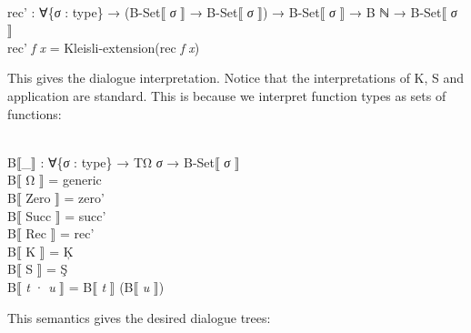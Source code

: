 \documentclass{entcs} \usepackage{prentcsmacro}
\newcommand{\AgdaFontStyle}[1]{\textsf{#1}}
\newcommand{\AgdaBoundFontStyle}[1]{\textit{#1}}
\newcommand{\AgdaSymbol}      [1]{\textcolor{AgdaSymbol}{#1}}
\newcommand{\AgdaBound}    [1]{\AgdaBoundFontStyle{\textcolor{AgdaBound}{#1}}}
\newcommand{\AgdaInductiveConstructor}[1]
    {\AgdaFontStyle{\textcolor{AgdaInductiveConstructor}{#1}}}
\newcommand{\AgdaDatatype} [1]{\AgdaFontStyle{\textcolor{AgdaDatatype}{#1}}}
\newcommand{\AgdaFunction} [1]{\AgdaFontStyle{\textcolor{AgdaFunction}{#1}}}
\newcommand{\AgdaCodeStyle}{\small}
\newenvironment{code}%
{\noindent\AgdaCodeStyle\pboxed}%
{\endpboxed\par\noindent%
\ignorespacesafterend}
\begin{document}
\begin{code}\>\<%
\\
\>\AgdaFunction{rec'} \AgdaSymbol{:} \AgdaSymbol{∀\{}\AgdaBound{σ} \AgdaSymbol{:} \AgdaDatatype{type}\AgdaSymbol{\}} \AgdaSymbol{→} \AgdaSymbol{(}\AgdaFunction{B-Set⟦} \AgdaBound{σ} \AgdaFunction{⟧} \AgdaSymbol{→} \AgdaFunction{B-Set⟦} \AgdaBound{σ} \AgdaFunction{⟧}\AgdaSymbol{)} \AgdaSymbol{→} \AgdaFunction{B-Set⟦} \AgdaBound{σ} \AgdaFunction{⟧} \AgdaSymbol{→} \AgdaFunction{B} \AgdaDatatype{ℕ} \AgdaSymbol{→} \AgdaFunction{B-Set⟦} \AgdaBound{σ} \AgdaFunction{⟧}\<%
\\
\>\AgdaFunction{rec'} \AgdaBound{f} \AgdaBound{x} \AgdaSymbol{=} \AgdaFunction{Kleisli-extension}\AgdaSymbol{(}\AgdaFunction{rec} \AgdaBound{f} \AgdaBound{x}\AgdaSymbol{)}\<%
\\
\>\<\end{code}
This gives the  dialogue interpretation. Notice that the interpretations
of K, S and application are standard. This is because we interpret
function types as sets of functions:

\begin{code}\>\<%
\\
\>\AgdaFunction{B⟦\_⟧} \AgdaSymbol{:} \AgdaSymbol{∀\{}\AgdaBound{σ} \AgdaSymbol{:} \AgdaDatatype{type}\AgdaSymbol{\}} \AgdaSymbol{→} \AgdaDatatype{TΩ} \AgdaBound{σ} \AgdaSymbol{→} \AgdaFunction{B-Set⟦} \AgdaBound{σ} \AgdaFunction{⟧}\<%
\\
\>\AgdaFunction{B⟦} \AgdaInductiveConstructor{Ω} \AgdaFunction{⟧} \<[11]%
\>[11]\AgdaSymbol{=} \AgdaFunction{generic}\<%
\\
\>\AgdaFunction{B⟦} \AgdaInductiveConstructor{Zero} \AgdaFunction{⟧} \<[11]%
\>[11]\AgdaSymbol{=} \AgdaFunction{zero'}\<%
\\
\>\AgdaFunction{B⟦} \AgdaInductiveConstructor{Succ} \AgdaFunction{⟧} \<[11]%
\>[11]\AgdaSymbol{=} \AgdaFunction{succ'}\<%
\\
\>\AgdaFunction{B⟦} \AgdaInductiveConstructor{Rec} \AgdaFunction{⟧} \<[11]%
\>[11]\AgdaSymbol{=} \AgdaFunction{rec'}\<%
\\
\>\AgdaFunction{B⟦} \AgdaInductiveConstructor{K} \AgdaFunction{⟧} \<[11]%
\>[11]\AgdaSymbol{=} \AgdaFunction{Ķ}\<%
\\
\>\AgdaFunction{B⟦} \AgdaInductiveConstructor{S} \AgdaFunction{⟧} \<[11]%
\>[11]\AgdaSymbol{=} \AgdaFunction{Ş}\<%
\\
\>\AgdaFunction{B⟦} \AgdaBound{t} \AgdaInductiveConstructor{·} \AgdaBound{u} \AgdaFunction{⟧} \<[13]%
\>[13]\AgdaSymbol{=} \AgdaFunction{B⟦} \AgdaBound{t} \AgdaFunction{⟧} \AgdaSymbol{(}\AgdaFunction{B⟦} \AgdaBound{u} \AgdaFunction{⟧}\AgdaSymbol{)}\<%
\\
\>\<\end{code}
This semantics gives the desired dialogue trees:
\end{document}
